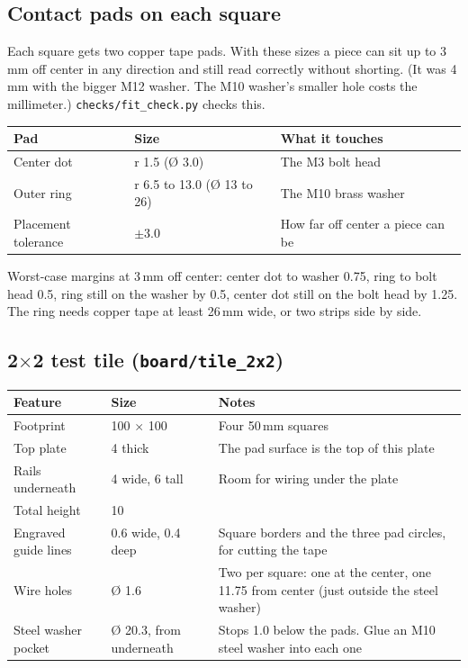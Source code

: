 \documentclass[10pt]{article}
\newcommand{\mm}{\,mm}
\newcommand{\file}[1]{\texttt{#1}}
\begin{document}
\subsection{Contact pads on each square}

Each square gets two copper tape pads. With these sizes a piece can sit up to 3\mm{} off
center in any direction and still read correctly without shorting. (It was 4\mm{} with the
bigger M12 washer. The M10 washer's smaller hole costs the millimeter.)
\file{checks/fit\_check.py} checks this.

\begin{tabularx}{\textwidth}{l l L}
\toprule
Pad & Size & What it touches \\
\midrule
Center dot & r 1.5 (\O{} 3.0) & The M3 bolt head \\
Outer ring & r 6.5 to 13.0 (\O{} 13 to 26) & The M10 brass washer \\
Placement tolerance & $\pm$3.0 & How far off center a piece can be \\
\bottomrule
\end{tabularx}

Worst-case margins at 3\mm{} off center: center dot to washer 0.75, ring to bolt head 0.5,
ring still on the washer by 0.5, center dot still on the bolt head by 1.25. The ring needs copper
tape at least 26\mm{} wide, or two strips side by side.

\subsection{2$\times$2 test tile (\file{board/tile\_2x2})}

\begin{tabularx}{\textwidth}{l l L}
\toprule
Feature & Size & Notes \\
\midrule
Footprint & 100 $\times$ 100 & Four 50\mm{} squares \\
Top plate & 4 thick & The pad surface is the top of this plate \\
Rails underneath & 4 wide, 6 tall & Room for wiring under the plate \\
Total height & 10 & \\
Engraved guide lines & 0.6 wide, 0.4 deep & Square borders and the three pad circles, for cutting the tape \\
Wire holes & \O{} 1.6 & Two per square: one at the center, one 11.75 from center (just outside the steel washer) \\
Steel washer pocket & \O{} 20.3, from underneath & Stops 1.0 below the pads. Glue an M10 steel washer into each one \\
\bottomrule
\end{tabularx}
\end{document}
